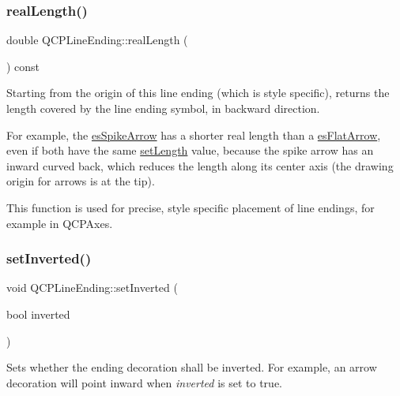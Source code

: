 \mbox{\label{class_q_c_p_line_ending_acacd24d386d459b282d3c57f16a5405d}} 
\subsubsection{\texorpdfstring{real\+Length()}{realLength()}}
{\footnotesize\ttfamily double Q\+C\+P\+Line\+Ending\+::real\+Length (\begin{DoxyParamCaption}{ }\end{DoxyParamCaption}) const}

Starting from the origin of this line ending (which is style specific), returns the length covered by the line ending symbol, in backward direction.

For example, the \hyperlink{class_q_c_p_line_ending_a5ef16e6876b4b74959c7261d8d4c2cd5ab9964d0d03f812d1e79de15edbeb2cbf}{es\+Spike\+Arrow} has a shorter real length than a \hyperlink{class_q_c_p_line_ending_a5ef16e6876b4b74959c7261d8d4c2cd5a3d7dcea2f100671727c3417142154f8f}{es\+Flat\+Arrow}, even if both have the same \hyperlink{class_q_c_p_line_ending_ae36fa01763751cd64b7f56c3507e935a}{set\+Length} value, because the spike arrow has an inward curved back, which reduces the length along its center axis (the drawing origin for arrows is at the tip).

This function is used for precise, style specific placement of line endings, for example in Q\+C\+P\+Axes. \mbox{\label{class_q_c_p_line_ending_a580e4e2360b35ebb8d68f3494aa2335d}} 
\subsubsection{\texorpdfstring{set\+Inverted()}{setInverted()}}
{\footnotesize\ttfamily void Q\+C\+P\+Line\+Ending\+::set\+Inverted (\begin{DoxyParamCaption}\item[{bool}]{inverted }\end{DoxyParamCaption})}

Sets whether the ending decoration shall be inverted. For example, an arrow decoration will point inward when {\itshape inverted} is set to true.

